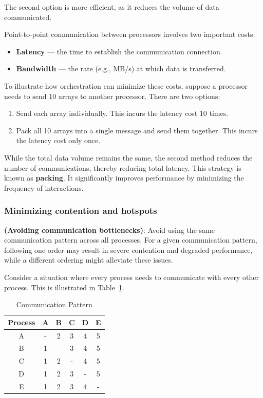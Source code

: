 \documentclass[12pt]{book}
\begin{document}
The second option is more efficient, as it reduces the volume of data communicated.

Point-to-point communication between processors involves two important costs:
\begin{itemize}
    \item \textbf{Latency} — the time to establish the communication connection.
    \item \textbf{Bandwidth} — the rate (e.g., MB/s) at which data is transferred.
\end{itemize}

To illustrate how orchestration can minimize these costs, suppose a processor needs to send 10 arrays to another processor. There are two options:
\begin{enumerate}
    \item Send each array individually. This incurs the latency cost 10 times.
    \item Pack all 10 arrays into a single message and send them together. This incurs the latency cost only once.
\end{enumerate}

While the total data volume remains the same, the second method reduces the number of communications, thereby reducing total latency. This strategy is known as \textbf{packing}. It significantly improves performance by minimizing the frequency of interactions.

\subsubsection{Minimizing contention and hotspots}
\textbf{(Avoiding communication bottlenecks)}: Avoid using the same communication pattern across all processes. For a given communication pattern, following one order may result in severe contention and degraded performance, while a different ordering might alleviate these issues.

Consider a situation where every process needs to communicate with every other process. This is illustrated in Table~\ref{tab:communication}.

\begin{table}[H]
    \centering
    \begin{tabular}{|c|c|c|c|c|c|}
        \hline
        Process & A & B & C & D & E \\
        \hline
        A & - & 2 & 3 & 4 & 5 \\
        B & 1 & - & 3 & 4 & 5 \\
        C & 1 & 2 & - & 4 & 5 \\
        D & 1 & 2 & 3 & - & 5 \\
        E & 1 & 2 & 3 & 4 & - \\
        \hline
    \end{tabular}
    \caption{Communication Pattern}
    \label{tab:communication}
\end{table}
\end{document}
